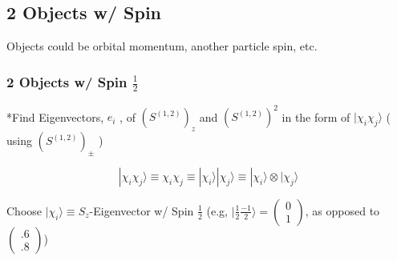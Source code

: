 \documentclass[12pt]{article}
\begin{document}
\newpage
\subsection{2 Objects w/ Spin}
{\scriptsize Objects could be orbital momentum, another particle spin, etc.}

\vspace{5pt}
\subsubsection{2 Objects w/ Spin \(\frac{1}{2}\)}

\vspace{10pt}
*Find Eigenvectors, \(e_i\) , of \( ( S^{ (1,2) } )_z \) and 
    \( ( S^{ (1,2) } )^2 \) in the form of \( | \chi_i \chi_j \rangle \) ( using \( ( S^{ (1,2) } )_\pm \) )

\vspace{15pt}\noindent
\[ \boxed{ | \chi_i \chi_j \rangle \equiv \chi_i \chi_j \equiv | \chi_i \rangle | \chi_j \rangle 
    \equiv | \chi_i \rangle \otimes | \chi_j \rangle } \]

\vspace{20pt} \noindent
Choose \( | \chi_i \rangle \equiv S_z\)-Eigenvector w/ 
    Spin \(\frac{1}{2}\) (e.g, \( | \frac{1}{2} \frac{-1}{2} \rangle 
        = \left( \begin{smallmatrix} 0 \\ 1 \end{smallmatrix} \right) \), 
        as opposed to \( \left( \begin{smallmatrix} .6 \\ .8 \end{smallmatrix} \right) \))
\end{document}
